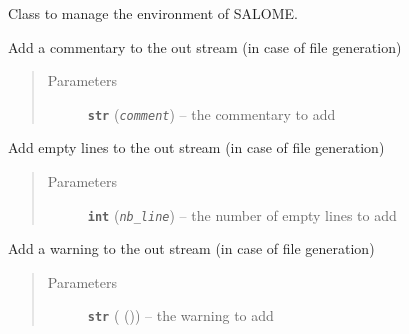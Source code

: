 \documentclass[a4paper,10pt,english]{sphinxmanual}
\begin{document}
\begin{fulllineitems}
\label{commands/apidoc/src:src.environment.SalomeEnviron}
Class to manage the environment of SALOME.

\begin{fulllineitems}
\label{commands/apidoc/src:src.environment.SalomeEnviron.add_comment}
Add a commentary to the out stream (in case of file generation)
\begin{quote}\begin{description}
\item[{Parameters}] \leavevmode
\textbf{\texttt{str}} (\emph{\texttt{comment}}) -- the commentary to add

\end{description}\end{quote}

\end{fulllineitems}


\begin{fulllineitems}
\label{commands/apidoc/src:src.environment.SalomeEnviron.add_line}
Add empty lines to the out stream (in case of file generation)
\begin{quote}\begin{description}
\item[{Parameters}] \leavevmode
\textbf{\texttt{int}} (\emph{\texttt{nb\_line}}) -- the number of empty lines to add

\end{description}\end{quote}

\end{fulllineitems}


\begin{fulllineitems}
\label{commands/apidoc/src:src.environment.SalomeEnviron.add_warning}
Add a warning to the out stream (in case of file generation)
\begin{quote}\begin{description}
\item[{Parameters}] \leavevmode
\textbf{\texttt{str}} ({\hyperref[commands/apidoc/src:src.utilsSat.warning]{}} ()) -- the warning to add


\end{description}
\end{quote}
\end{fulllineitems}
\end{fulllineitems}
\end{document}
